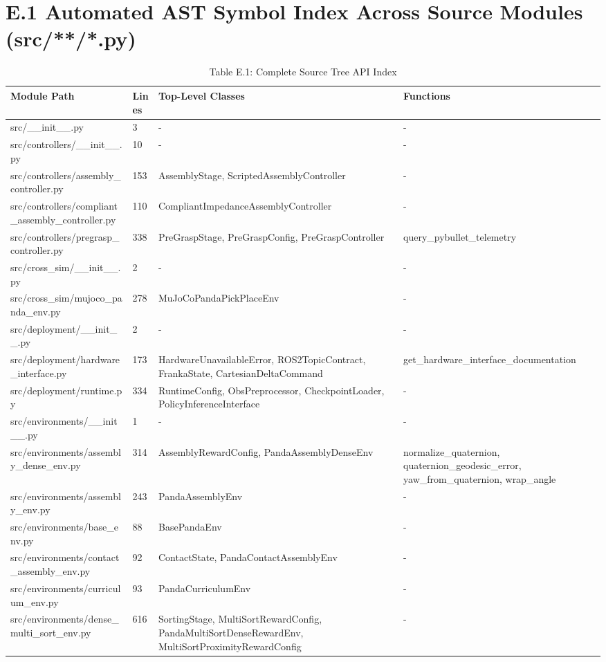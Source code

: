 \documentclass[11pt,a4paper,oneside]{book}
\begin{document}
\section{E.1 Automated AST Symbol Index Across Source Modules (src/**/*.py)}
\begin{longtable}{l l l l}\caption{Table E.1: Complete Source Tree API Index}\\\toprule
Module Path & Lines & Top-Level Classes & Functions \\ \midrule \endhead
src/\_\_init\_\_.py & 3 & - & - \\
src/controllers/\_\_init\_\_.py & 10 & - & - \\
src/controllers/assembly\_controller.py & 153 & AssemblyStage, ScriptedAssemblyController & - \\
src/controllers/compliant\_assembly\_controller.py & 110 & CompliantImpedanceAssemblyController & - \\
src/controllers/pregrasp\_controller.py & 338 & PreGraspStage, PreGraspConfig, PreGraspController & query\_pybullet\_telemetry \\
src/cross\_sim/\_\_init\_\_.py & 2 & - & - \\
src/cross\_sim/mujoco\_panda\_env.py & 278 & MuJoCoPandaPickPlaceEnv & - \\
src/deployment/\_\_init\_\_.py & 2 & - & - \\
src/deployment/hardware\_interface.py & 173 & HardwareUnavailableError, ROS2TopicContract, FrankaState, CartesianDeltaCommand & get\_hardware\_interface\_documentation \\
src/deployment/runtime.py & 334 & RuntimeConfig, ObsPreprocessor, CheckpointLoader, PolicyInferenceInterface & - \\
src/environments/\_\_init\_\_.py & 1 & - & - \\
src/environments/assembly\_dense\_env.py & 314 & AssemblyRewardConfig, PandaAssemblyDenseEnv & normalize\_quaternion, quaternion\_geodesic\_error, yaw\_from\_quaternion, wrap\_angle \\
src/environments/assembly\_env.py & 243 & PandaAssemblyEnv & - \\
src/environments/base\_env.py & 88 & BasePandaEnv & - \\
src/environments/contact\_assembly\_env.py & 92 & ContactState, PandaContactAssemblyEnv & - \\
src/environments/curriculum\_env.py & 93 & PandaCurriculumEnv & - \\
src/environments/dense\_multi\_sort\_env.py & 616 & SortingStage, MultiSortRewardConfig, PandaMultiSortDenseRewardEnv, MultiSortProximityRewardConfig & - \\

\end{longtable}
\end{document}

